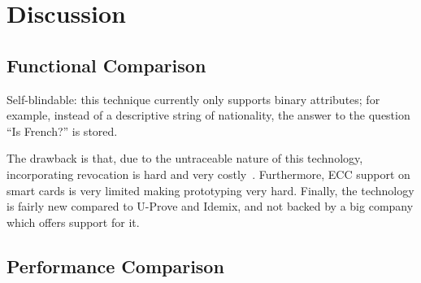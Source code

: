 \chapter{Discussion\label{chp:discussion}}

\section{Functional Comparison}

Self-blindable:
 this technique currently only supports binary
attributes; for example, instead of a descriptive string of nationality, the
answer to the question ``Is French?'' is stored.

The drawback is that, due to the untraceable nature of this technology,
incorporating revocation is hard and very costly~\cite{HoepmanLV11}. %
Furthermore, ECC support on smart cards is very limited making prototyping
very hard. Finally, the technology is fairly new compared to U-Prove and
Idemix, and not backed by a big company which offers support for it.

\section{Performance Comparison}